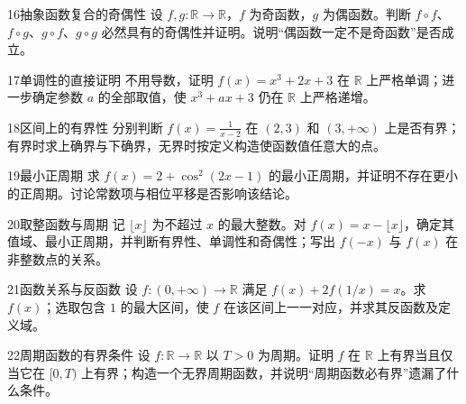 \begin{exercise}{16}{抽象函数复合的奇偶性}
设 $f,g:\mathbb R\to\mathbb R$，$f$ 为奇函数，$g$ 为偶函数。判断 $f\circ f$、$f\circ g$、$g\circ f$、$g\circ g$ 必然具有的奇偶性并证明。说明“偶函数一定不是奇函数”是否成立。
\end{exercise}
\begin{exercise}{17}{单调性的直接证明}
不用导数，证明 $f(x)=x^3+2x+3$ 在 $\mathbb R$ 上严格单调；进一步确定参数 $a$ 的全部取值，使 $x^3+ax+3$ 仍在 $\mathbb R$ 上严格递增。
\end{exercise}
\begin{exercise}{18}{区间上的有界性}
分别判断 $f(x)=\frac1{x-2}$ 在 $(2,3)$ 和 $(3,+\infty)$ 上是否有界；有界时求上确界与下确界，无界时按定义构造使函数值任意大的点。
\end{exercise}
\begin{exercise}{19}{最小正周期}
求 $f(x)=2+\cos^2(2x-1)$ 的最小正周期，并证明不存在更小的正周期。讨论常数项与相位平移是否影响该结论。
\end{exercise}
\begin{exercise}{20}{取整函数与周期}
记 $\lfloor x\rfloor$ 为不超过 $x$ 的最大整数。对 $f(x)=x-\lfloor x\rfloor$，确定其值域、最小正周期，并判断有界性、单调性和奇偶性；写出 $f(-x)$ 与 $f(x)$ 在非整数点的关系。
\end{exercise}
\begin{exercise}{21}{函数关系与反函数}
设 $f:(0,+\infty)\to\mathbb R$ 满足 $f(x)+2f(1/x)=x$。求 $f(x)$；选取包含 $1$ 的最大区间，使 $f$ 在该区间上一一对应，并求其反函数及定义域。
\end{exercise}
\begin{exercise}{22}{周期函数的有界条件}
设 $f:\mathbb R\to\mathbb R$ 以 $T>0$ 为周期。证明 $f$ 在 $\mathbb R$ 上有界当且仅当它在 $[0,T)$ 上有界；构造一个无界周期函数，并说明“周期函数必有界”遗漏了什么条件。
\end{exercise}
